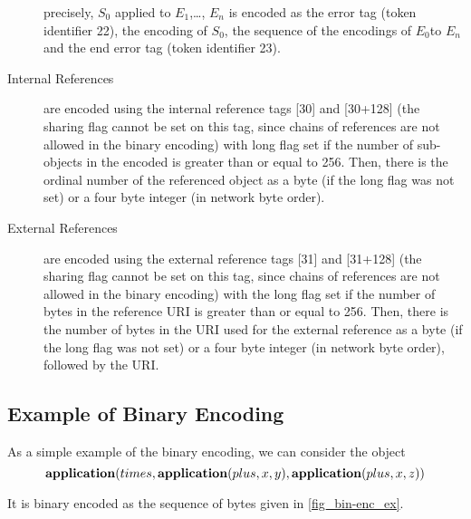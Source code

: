 \begin{description}
    precisely, $S_0$ applied to $E_1$,\ldots, $E_n$ is encoded as the error tag (token
    identifier 22), the encoding of $S_0$, the sequence of the encodings of $E_0$to $E_n$
    and the end error tag (token identifier 23).
\item[Internal References] are encoded using the internal reference tags [30] and [30+128]
  (the sharing flag cannot be set on this tag, since chains of references are not allowed
  in the \OM binary encoding) with long flag set if the number of \OM sub-objects in the
  encoded \OM is greater than or equal to 256. Then, there is the ordinal number of the
  referenced \OM object as a byte (if the long flag was not set) or a four byte integer
  (in network byte order).
\item[External References] are encoded using the external reference tags [31] and [31+128]
  (the sharing flag cannot be set on this tag, since chains of references are not allowed
  in the \OM binary encoding) with the long flag set if the number of bytes in the
  reference URI is greater than or equal to 256. Then, there is the number of bytes in the
  URI used for the external reference as a byte (if the long flag was not set) or a four
  byte integer (in network byte order), followed by the URI.
\end{description} 

\subsection{Example of Binary Encoding}\label{sec_bin_example}

As a simple
example of the binary encoding, we can consider the \OM object
\[\mathbf{application}(times,\mathbf{application}(plus,x,y),\mathbf{application}(plus,x,z))\]

It is binary encoded as the sequence of bytes given in \ref{fig_bin-enc_ex}.

